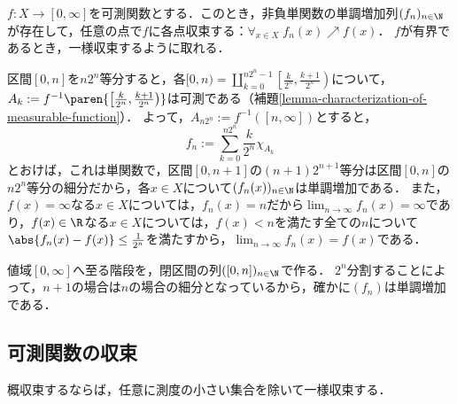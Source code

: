 \documentclass[uplatex, dvipdfmx]{jsreport}
\begin{document}
\begin{theorem}[単関数近似]\label{thm-simple-function-approximation}
    $f:X\to[0,\infty]$を可測関数とする．このとき，非負単関数の単調増加列$(f_n)_{n\in\N}$が存在して，任意の点で$f$に各点収束する：$\forall_{x\in X}\;f_n(x)\nearrow f(x)$．
    $f$が有界であるとき，一様収束するように取れる．
\end{theorem}
\begin{Proof}
    区間$[0,n]$を$n2^n$等分すると，各$[0,n)=\coprod_{k=0}^{n2^n-1}\left[\frac{k}{2^n},\frac{k+1}{2^n}\right)$について，$A_k:=f^{-1}\paren{\left[\frac{k}{2^n},\frac{k+1}{2^n}\right)}$は可測である（補題\ref{lemma-characterization-of-measurable-function}）．
    よって，$A_{n2^n}:=f^{-1}([n,\infty])$とすると，
    \[f_n:=\sum^{n2^n}_{k=0}\frac{k}{2^n}\chi_{A_k}\]
    とおけば，これは単関数で，区間$[0,n+1]$の$(n+1)2^{n+1}$等分は区間$[0,n]$の$n2^n$等分の細分だから，各$x\in X$について$(f_n(x))_{n\in\N}$は単調増加である．
    また，$f(x)=\infty$なる$x\in X$については，$f_n(x)=n$だから$\lim_{n\to\infty}f_n(x)=\infty$であり，$f(x)\in\R$なる$x\in X$については，$f(x)<n$を満たす全ての$n$について$\abs{f_n(x)-f(x)}\le\frac{1}{2^n}$を満たすから，$\lim_{n\to\infty}f_n(x)=f(x)$である．
\end{Proof}
\begin{remarks}
    値域$[0,\infty]$へ至る階段を，閉区間の列$([0,n])_{n\in\N}$で作る．
    $2^n$分割することによって，$n+1$の場合は$n$の場合の細分となっているから，確かに$(f_n)$は単調増加である．
\end{remarks}

\subsection{可測関数の収束}

\begin{tcolorbox}[colframe=ForestGreen, colback=ForestGreen!10!white,breakable,colbacktitle=ForestGreen!40!white,coltitle=black,fonttitle=\bfseries\sffamily,
    title=]
    概収束するならば，任意に測度の小さい集合を除いて一様収束する．
\end{tcolorbox}
\end{document}
